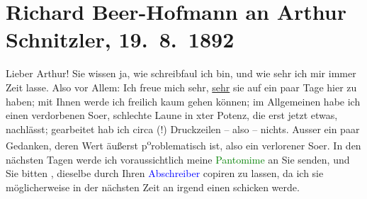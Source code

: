 

               \section[Richard Beer-Hofmann an Arthur Schnitzler, 19. 8. 1892]{ Richard Beer-Hofmann an Arthur Schnitzler, 19. 8. 1892}\nopagebreak{}\rehead{ }\normalsize\beginnumbering{} \toendnotes[C]{\smallbreak\pagebreak[2]} 
\toendnotes[C]{\smallbreak}\pstart
           \noindent{}{\pb}Lieber Arthur! Sie wissen ja, wie schreibfaul ich bin, und wie sehr
               ich mir immer Zeit lasse.\pend
           \pstart
           Also vor Allem: Ich freue mich sehr, \uline{sehr} sie auf ein
               paar Tage hier zu haben; mit Ihnen {\pb}werde ich freilich kaum gehen können; im Allgemeinen habe ich einen verdorbenen
                  So{\geminationm}er, schlechte Laune in xter Potenz, die erst jetzt
               etwas, nachlässt; gearbeitet {\pb}hab
               ich circa  (!) Druckzeilen – also – nichts. Ausser
               ein paar Gedanken, deren Wert äußerst p\substVorne{}\textsuperscript{o}\substDazwischen{}ro\substHinten{}blematisch ist, also ein verlorener So{\geminationm}er. In
               den nächsten {\pb}Tagen werde ich
               voraussichtlich meine \textcolor{green}{Pantomime}{} an Sie senden, und Sie bitten ,
               dieselbe durch Ihren \textcolor{blue}{Abschreiber}{} copiren zu lassen, da ich sie möglicherweise in der nächsten
               Zeit an irgend einen \label{K_L00115_1v}\label{K_L00115_1h}{\pb} schicken werde.\pend
